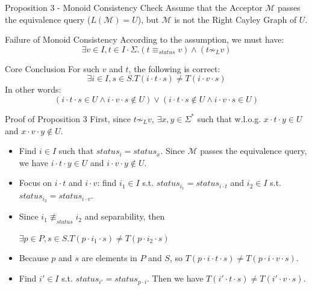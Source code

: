 \documentclass{beamer}
\begin{document}
\begin{frame}{Proposition 3 - Monoid Consistency Check}
    Assume that the Acceptor $\mathcal{M}$ passes the equivalence query ($L(\mathcal{M}) = U$), 
    but $\mathcal{M}$ is not the Right Cayley Graph of $U$. 
    
    \begin{block}{Failure of Monoid Consistency}
        According to the assumption, we must have:
        \[
        \exists v \in I, t \in I \cdot \Sigma. (t \equiv_{status} v) \wedge (t \not\sim_L v)
        \]
    \end{block}

    \begin{block}{Core Conclusion}
        For such $v$ and $t$, the following is correct:
        \[
         \exists i \in I, s \in S. T(i \cdot t \cdot s) \neq T(i \cdot v \cdot s)
        \]
        In other words:
        \[
        (i \cdot t \cdot s \in U \wedge i \cdot v \cdot s \notin U) \vee (i \cdot t \cdot s \notin U \wedge i \cdot v \cdot s \in U)
        \]
    \end{block}
\end{frame}

\begin{frame}{Proof of Proposition 3}
    \small
    First, since $t \not\sim_L v$, $\exists x, y \in \Sigma^*$ such that w.l.o.g. $x \cdot t \cdot y \in U$ and $x \cdot v \cdot y \notin U$.
    \begin{itemize}
        \item Find $i \in I$ such that $status_i = status_x$. Since $\mathcal{M}$ passes the equivalence query, we have $i \cdot t \cdot y \in U$ and $i \cdot v \cdot y \notin U$.
        \item Focus on $i \cdot t$ and $i \cdot v$: find $i_1 \in I$ s.t. $status_{i_1} = status_{i \cdot t}$ and $i_2 \in I$ s.t. $status_{i_2} = status_{i \cdot v}$.
        \item Since $i_1 \not\equiv_{status} i_2$ and separability, then 
        
        $\exists p\in P, s \in S. T(p \cdot i_1 \cdot s) \neq T(p \cdot i_2 \cdot s)$
        \item Because $p$ and $s$ are elements in $P$ and $S$, so $T(p \cdot i \cdot t \cdot s) \neq T(p \cdot i \cdot v \cdot s)$.
        \item Find $i' \in I$ s.t. $status_{i'} = status_{p \cdot i}$.  Then we have $T(i' \cdot t \cdot s) \neq T(i' \cdot v \cdot s)$.
    \end{itemize}

\end{frame}
\end{document}
